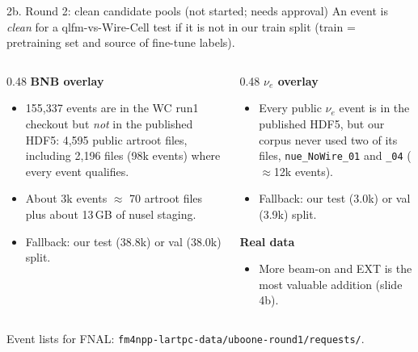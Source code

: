 \documentclass[aspectratio=169,10pt]{beamer}
\newcommand{\code}[1]{\texttt{#1}}
\begin{document}
\begin{frame}{2b. Round 2: clean candidate pools (not started; needs approval)}
  \footnotesize
  An event is \emph{clean} for a qlfm-vs-Wire-Cell test if it is not in our train split (train = pretraining set and source of fine-tune labels).
  \vspace{6pt}
  \begin{columns}[T]
    \begin{column}{0.48\textwidth}
      \textbf{BNB overlay}
      \begin{itemize}
        \item 155,337 events are in the WC run1 checkout but \emph{not} in the published HDF5: 4,595 public artroot files, including 2,196 files (98k events) where every event qualifies.
        \item About 3k events $\approx$ 70 artroot files plus about 13\,GB of nusel staging.
        \item Fallback: our test (38.8k) or val (38.0k) split.
      \end{itemize}
    \end{column}
    \begin{column}{0.48\textwidth}
      \textbf{$\nu_e$ overlay}
      \begin{itemize}
        \item Every public $\nu_e$ event is in the published HDF5, but our corpus never used two of its files, \code{nue\_NoWire\_01} and \code{\_04} ($\approx$12k events).
        \item Fallback: our test (3.0k) or val (3.9k) split.
      \end{itemize}
      \textbf{Real data}
      \begin{itemize}
        \item More beam-on and EXT is the most valuable addition (slide 4b).
      \end{itemize}
    \end{column}
  \end{columns}
  \vfill
  {\scriptsize Event lists for FNAL: \code{fm4npp-lartpc-data/uboone-round1/requests/}.}
\end{frame}
\end{document}
